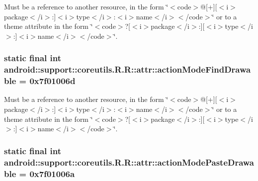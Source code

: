 Must be a reference to another resource, in the form \char`\"{}$<$code$>$@\mbox{[}+\mbox{]}\mbox{[}$<$i$>$package$<$/i$>$:\mbox{]}$<$i$>$type$<$/i$>$:$<$i$>$name$<$/i$>$$<$/code$>$\char`\"{} or to a theme attribute in the form \char`\"{}$<$code$>$?\mbox{[}$<$i$>$package$<$/i$>$:\mbox{]}\mbox{[}$<$i$>$type$<$/i$>$:\mbox{]}$<$i$>$name$<$/i$>$$<$/code$>$\char`\"{}. \hypertarget{classandroid_1_1support_1_1coreutils_1_1_r_1_1attr_e8e32e1d3f7f57d613578c57c32bd26d}{
\subsubsection[{actionModeFindDrawable}]{\setlength{\rightskip}{0pt plus 5cm}static final int android::support::coreutils.R.R::attr::actionModeFindDrawable = 0x7f01006d}}
\label{classandroid_1_1support_1_1coreutils_1_1_r_1_1attr_e8e32e1d3f7f57d613578c57c32bd26d}


Must be a reference to another resource, in the form \char`\"{}$<$code$>$@\mbox{[}+\mbox{]}\mbox{[}$<$i$>$package$<$/i$>$:\mbox{]}$<$i$>$type$<$/i$>$:$<$i$>$name$<$/i$>$$<$/code$>$\char`\"{} or to a theme attribute in the form \char`\"{}$<$code$>$?\mbox{[}$<$i$>$package$<$/i$>$:\mbox{]}\mbox{[}$<$i$>$type$<$/i$>$:\mbox{]}$<$i$>$name$<$/i$>$$<$/code$>$\char`\"{}. \hypertarget{classandroid_1_1support_1_1coreutils_1_1_r_1_1attr_de2d347353e72ad3bde97cfa6d44dc2b}{
\subsubsection[{actionModePasteDrawable}]{\setlength{\rightskip}{0pt plus 5cm}static final int android::support::coreutils.R.R::attr::actionModePasteDrawable = 0x7f01006a}}
\label{classandroid_1_1support_1_1coreutils_1_1_r_1_1attr_de2d347353e72ad3bde97cfa6d44dc2b}


